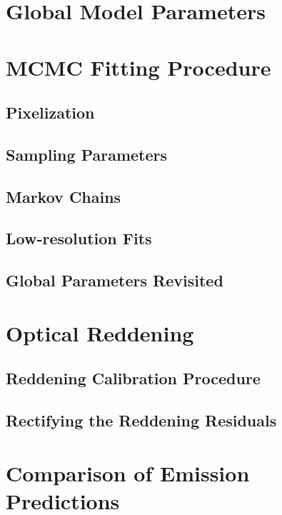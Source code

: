 \documentclass{emulateapj}
\begin{document}
\section{Global Model Parameters}
\label{sec:global}

\section{MCMC Fitting Procedure}
\label{sec:fitting}

\subsection{Pixelization}
\label{sec:pix}

\subsection{Sampling Parameters}
\label{sec:samp}

\subsection{Markov Chains}
\label{sec:mcmc}

\subsection{Low-resolution Fits}
\label{sec:lores}

\subsection{Global Parameters Revisited}
\label{sec:hier}

\section{Optical Reddening}
\label{sec:ebv}

\subsection{Reddening Calibration Procedure}
\label{sec:calib_ebv}

\subsection{Rectifying the Reddening Residuals}

\section{Comparison of Emission Predictions}
\label{sec:em_compare}
\end{document}
